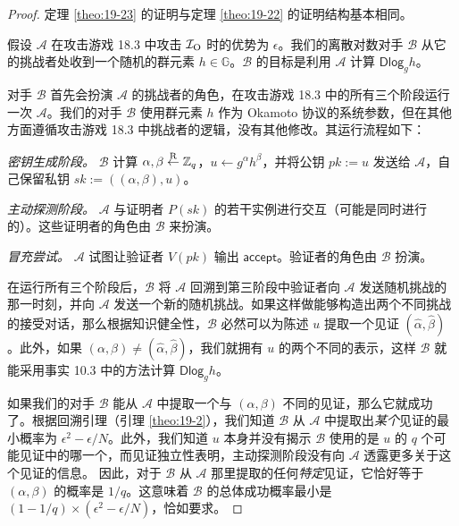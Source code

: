 \begin{proof}
定理 \ref{theo:19-23} 的证明与定理 \ref{theo:19-22} 的证明结构基本相同。

假设 $\mathcal{A}$ 在攻击游戏 18.3 中攻击 $\mathcal{I}_{\rm O}$ 时的优势为 $\epsilon$。我们的离散对数对手 $\mathcal{B}$ 从它的挑战者处收到一个随机的群元素 $h\in\mathbb{G}$。$\mathcal{B}$ 的目标是利用 $\mathcal{A}$ 计算 $\mathsf{Dlog}_gh$。

对手 $\mathcal{B}$ 首先会扮演 $\mathcal{A}$ 的挑战者的角色，在攻击游戏 18.3 中的所有三个阶段运行一次 $\mathcal{A}$。我们的对手 $\mathcal{B}$ 使用群元素 $h$ 作为 Okamoto 协议的系统参数，但在其他方面遵循攻击游戏 18.3 中挑战者的逻辑，没有其他修改。其运行流程如下：

\vspace*{5pt}

\emph{密钥生成阶段。}
$\mathcal{B}$ 计算 $\alpha,\beta\overset{\rm R}\leftarrow\mathbb{Z}_q$，$u\leftarrow g^\alpha h^\beta$，并将公钥 $pk:=u$ 发送给 $\mathcal{A}$，自己保留私钥 $sk:=((\alpha,\beta),u)$。

\vspace*{5pt}

\emph{主动探测阶段。}
$\mathcal{A}$ 与证明者 $P(sk)$ 的若干实例进行交互（可能是同时进行的）。这些证明者的角色由 $\mathcal{B}$ 来扮演。

\vspace*{5pt}

\emph{冒充尝试。}
$\mathcal{A}$ 试图让验证者 $V(pk)$ 输出 $\mathsf{accept}$。验证者的角色由 $\mathcal{B}$ 扮演。

\vspace*{5pt}

在运行所有三个阶段后，$\mathcal{B}$ 将 $\mathcal{A}$ 回溯到第三阶段中验证者向 $\mathcal{A}$ 发送随机挑战的那一时刻，并向 $\mathcal{A}$ 发送一个新的随机挑战。如果这样做能够构造出两个不同挑战的接受对话，那么根据知识健全性，$\mathcal{B}$ 必然可以为陈述 $u$ 提取一个见证 $(\hat\alpha,\hat\beta)$。此外，如果 $(\alpha,\beta)\neq(\hat\alpha,\hat\beta)$，我们就拥有 $u$ 的两个不同的表示，这样 $\mathcal{B}$ 就能采用事实 10.3 中的方法计算 $\mathsf{Dlog}_gh$。

如果我们的对手 $\mathcal{B}$ 能从 $\mathcal{A}$ 中提取一个与 $(\alpha,\beta)$ 不同的见证，那么它就成功了。根据回溯引理（引理 \ref{theo:19-2}），我们知道 $\mathcal{B}$ 从 $\mathcal{A}$ 中提取出\emph{某个}见证的最小概率为 $\epsilon^2-{\epsilon}/{N}$。此外，我们知道 $u$ 本身并没有揭示 $\mathcal{B}$ 使用的是 $u$ 的 $q$ 个可能见证中的哪一个，而见证独立性表明，主动探测阶段没有向 $\mathcal{A}$ 透露更多关于这个见证的信息。 因此，对于 $\mathcal{B}$ 从 $\mathcal{A}$ 那里提取的任何\emph{特定}见证，它恰好等于 $(\alpha,\beta)$ 的概率是 ${1}/{q}$。这意味着 $\mathcal{B}$ 的总体成功概率最小是 $(1-{1}/{q})\times(\epsilon^2-{\epsilon}/{N})$，恰如要求。
\end{proof}